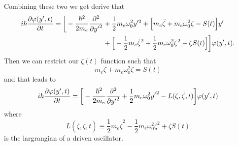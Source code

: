 \documentclass[a4paper]{article}
\numberwithin{equation}{subsection}
\numberwithin{equation}{section}
\begin{document}
Combining these two we get derive that
\begin{equation} \label{1.39}
  \begin{aligned}
    i \hbar \pdv{\varphi(y',t)}{t}   =
    \bigg[
        -  \frac{\hbar^2}{2m_e}\pdv[2]{{y'}}
        & + \frac{1}{2} m_e \omega_0^2 y'^2 +
        \Big[
            m_e\ddot{\zeta} + m_e\omega_0^2\zeta - S(t)
        \Big]y' \\
        &
        +
        \Big[
            - \frac{1}{2} m_e\dot{\zeta}^2 + \frac{1}{2}m_e\omega_0^2 \zeta^2 - \zeta S(t)
        \Big]
    \bigg]\varphi(y',t).
  \end{aligned}
\end{equation}
Then we can restrict our $\zeta(t)$ function such that
\begin{equation} \label{1.40}
  m_e\ddot{\zeta} + m_e\omega_0^2\zeta = S(t)
\end{equation}
and that leads to
\begin{equation} \label{1.41}
  \begin{aligned}
    i \hbar \pdv{\varphi(y',t)}{t}   =
    \bigg[
        -  \frac{\hbar^2}{2m_e}\pdv[2]{{y'}}
        + \frac{1}{2} m_e \omega_0^2 {y'}^2
        - L(\zeta,\dot{\zeta},t)
    \bigg]\varphi(y',t)
  \end{aligned}
\end{equation}
where
\begin{equation} \label{1.42}
  L(\zeta,\dot{\zeta},t) \equiv \frac{1}{2} m_e\dot{\zeta}^2 - \frac{1}{2}m_e\omega_0^2 \zeta^2 + \zeta S(t)
\end{equation}
is the largrangian of a driven oscillator.
\end{document}
